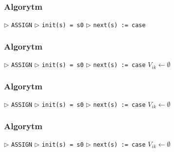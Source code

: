 \documentclass{beamer}
\begin{document}
\begin{frame}[fragile, t]    %

\frametitle{Algorytm}
\begin{algorithmic}
\State $\triangleright$ \verb!ASSIGN!
\State $\triangleright$ \verb!init(s) = s0!
\State $\triangleright$ \verb!next(s) := case!
   		
\end{algorithmic}
 
\end{frame}
 
\begin{frame}[fragile, t]    %

\frametitle{Algorytm}
\begin{algorithmic}
\State $\triangleright$ \verb!ASSIGN!
\State $\triangleright$ \verb!init(s) = s0!
\State $\triangleright$ \verb!next(s) := case!
   		\State $V_{ik} \gets \emptyset$ 
   		
\end{algorithmic}
 
\end{frame}
 
\begin{frame}[fragile, t]    %

\frametitle{Algorytm}
\begin{algorithmic}
\State $\triangleright$ \verb!ASSIGN!
\State $\triangleright$ \verb!init(s) = s0!
\State $\triangleright$ \verb!next(s) := case!
   		\State $V_{ik} \gets \emptyset$ 
   			
\end{algorithmic}
 
\end{frame}
 
\begin{frame}[fragile, t]    %

\frametitle{Algorytm}
\begin{algorithmic}
\State $\triangleright$ \verb!ASSIGN!
\State $\triangleright$ \verb!init(s) = s0!
\State $\triangleright$ \verb!next(s) := case!
   		\State $V_{ik} \gets \emptyset$ 
   				
\end{algorithmic}
 
\end{frame}
 
\end{document}
